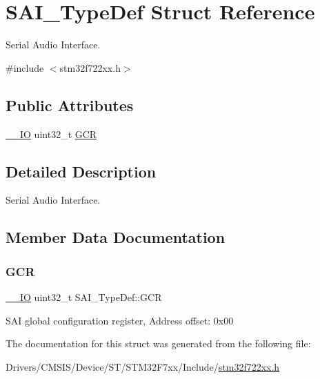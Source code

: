 \hypertarget{struct_s_a_i___type_def}{}\section{S\+A\+I\+\_\+\+Type\+Def Struct Reference}
\label{struct_s_a_i___type_def}


Serial Audio Interface.  




{\ttfamily \#include $<$stm32f722xx.\+h$>$}

\subsection*{Public Attributes}
\begin{DoxyCompactItemize}
\item 
\mbox{\hyperlink{core__sc300_8h_aec43007d9998a0a0e01faede4133d6be}{\+\_\+\+\_\+\+IO}} uint32\+\_\+t \mbox{\hyperlink{struct_s_a_i___type_def_ada6999b49bbe697c1dd5fdabc9bad7f4}{G\+CR}}
\end{DoxyCompactItemize}


\subsection{Detailed Description}
Serial Audio Interface. 

\subsection{Member Data Documentation}
\mbox{\label{struct_s_a_i___type_def_ada6999b49bbe697c1dd5fdabc9bad7f4}} 
\subsubsection{\texorpdfstring{GCR}{GCR}}
{\footnotesize\ttfamily \mbox{\hyperlink{core__sc300_8h_aec43007d9998a0a0e01faede4133d6be}{\+\_\+\+\_\+\+IO}} uint32\+\_\+t S\+A\+I\+\_\+\+Type\+Def\+::\+G\+CR}

S\+AI global configuration register, Address offset\+: 0x00 

The documentation for this struct was generated from the following file\+:\begin{DoxyCompactItemize}
\item 
Drivers/\+C\+M\+S\+I\+S/\+Device/\+S\+T/\+S\+T\+M32\+F7xx/\+Include/\mbox{\hyperlink{stm32f722xx_8h}{stm32f722xx.\+h}}\end{DoxyCompactItemize}

